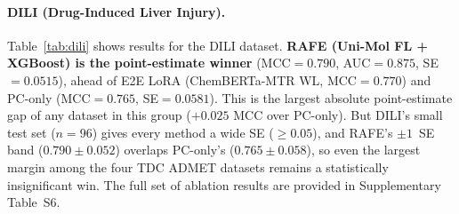 \documentclass[pdflatex,sn-mathphys-num]{sn-jnl}%
\begin{document}
\begin{table}[!ht]
\centering
\caption{Best configurations on hERG (binary, cardiac ion-channel inhibition).}
\label{tab:herg}
\end{table}

\paragraph{DILI (Drug-Induced Liver Injury).} Table~\ref{tab:dili} shows results for the DILI dataset. \textbf{RAFE (Uni-Mol FL + XGBoost) is the point-estimate winner} (MCC$=0.790$, AUC$=0.875$, SE$=0.0515$), ahead of E2E LoRA (ChemBERTa-MTR WL, MCC$=0.770$) and PC-only (MCC$=0.765$, SE$=0.0581$). This is the largest absolute point-estimate gap of any dataset in this group ($+0.025$ MCC over PC-only). But DILI's small test set ($n=96$) gives every method a wide SE ($\ge0.05$), and RAFE's $\pm1$~SE band ($0.790\pm0.052$) overlaps PC-only's ($0.765\pm0.058$), so even the largest margin among the four TDC ADMET datasets remains a statistically insignificant win. The full set of ablation results are provided in Supplementary Table~S6.
\end{document}

